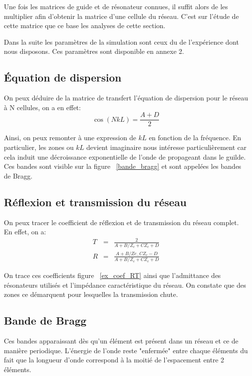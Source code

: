 Une fois les matrices de guide et de résonateur connues, il suffit alors de les multiplier afin d'obtenir la matrice d'une cellule du réseau. C'est sur l'étude de cette matrice que ce base les analyses de cette section. 

Dans la suite les paramètres de la simulation sont ceux du de l'expérience dont nous disposons. Ces paramètres sont disponible en annexe 2.

\subsection{Équation de dispersion}
On peux déduire de la matrice de transfert l'équation de dispersion pour le réseau à N cellules, on a en effet:
\begin{equation}
\cos(NkL) = \frac{A+D}{2} 
\end{equation}

Ainsi, on peux remonter à une expression de $kL$ en fonction de la fréquence. En particulier, les zones ou $kL$ devient imaginaire nous intéresse particulièrement car cela induit une décroissance exponentielle de l'onde de propageant dans le guilde. Ces bandes sont visible sur la figure ~\ref{bande_bragg} et sont appelées les bandes de Bragg.


\subsection{Réflexion et transmission du réseau}
On peux tracer le coefficient de réflexion et de transmission du réseau complet. En effet, on a:
\begin{eqnarray}
T & = & \frac{2}{A + B/Z_c + C Z_c + D} \\
R & = & \frac{A + B / Zc_ - C Z_c -D}{A + B/Z_c + C Z_c + D} 
\end{eqnarray}

On trace ces coefficients figure ~\ref{ex_coef_RT} ainsi que l'admittance des résonateurs utilisés et l'impédance caractéristique du réseau. On constate que des zones ce démarquent pour lesquelles  la transmission chute.

\subsection{Bande de Bragg}
Ces bandes apparaissant dès qu'un élément est présent dans un réseau et ce de manière periodique. L'énergie de l'onde reste "enfermée" entre chaque éléments du fait que la longueur d'onde correspond à la moitié de l'espacement entre 2 éléments. 

